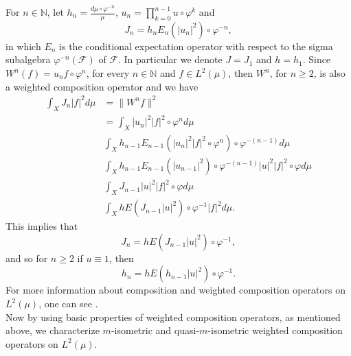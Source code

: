 \documentclass{amsart}
\theoremstyle{definition}\newtheorem{defn}[thm]{Definition}
\theoremstyle{remark}
\numberwithin{equation}{section}
\begin{document}
For $n\in \mathbb{N}$, let $h_n=\frac{d\mu\circ\varphi^{-n}}{\mu}$, $u_n=\prod^{n-1}_{k=0}u\circ\varphi^k$ and 
$$J_n=h_nE_n(|u_n|^2)\circ\varphi^{-n},$$
in which $E_n$ is the conditional expectation operator with respect to the sigma subalgebra $\varphi^{-n}(\mathcal{F})$ of $\mathcal{F}$. In particular we denote $J=J_1$ and $h=h_1$. Since $W^n(f)=u_nf\circ\varphi^n$, for every $n\in\mathbb{N}$ and $f\in L^2(\mu)$, then $W^n$, for $n\geq 2$, is also a weighted composition operator and we have 
\begin{align*}
\int_XJ_n|f|^2d\mu&=\|W^nf\|^2\\
&=\int_X|u_n|^2|f|^2\circ\varphi^nd\mu\\
&\int_Xh_{n-1}E_{n-1}(|u_n|^2|f|^2\circ\varphi^n)\circ\varphi^{-(n-1)}d\mu\\
&\int_Xh_{n-1}E_{n-1}(|u_{n-1}|^2)\circ\varphi^{-(n-1)}|u|^2|f|^2\circ\varphi d\mu\\
&\int_XJ_{n-1}|u|^2|f|^2\circ\varphi d\mu\\
&\int_XhE(J_{n-1}|u|^2)\circ\varphi^{-1}|f|^2d\mu.
\end{align*}
 This implies that
  $$J_n=hE(J_{n-1}|u|^2)\circ\varphi^{-1},$$
 and so for $n\geq 2$ if $u\equiv 1$, then 
 $$h_n=hE(h_{n-1}|u|^2)\circ\varphi^{-1}.$$ For more information about composition and weighted composition operators on $L^2(\mu)$, one can see \cite{bbl, cj}.\\

Now by using basic properties of weighted composition operators, as mentioned above, we characterize $m$-isometric and quasi-$m$-isometric weighted composition operators on $L^2(\mu)$.
\end{document}
